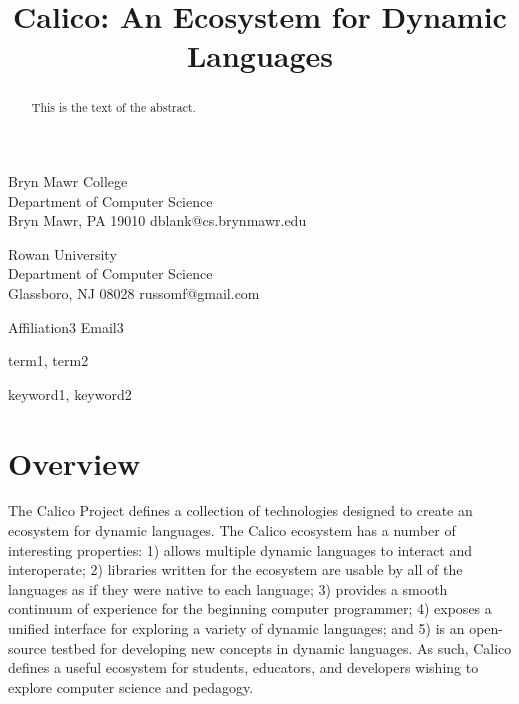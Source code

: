 \documentclass[preprint]{sigplanconf}
\begin{document}


\title{Calico: An Ecosystem for Dynamic Languages}

           {Bryn Mawr College\\Department of Computer Science\\Bryn Mawr, PA 19010}
           {dblank@cs.brynmawr.edu}

           {Rowan University\\Department of Computer Science\\Glassboro, NJ 08028}
           {russomf@gmail.com}

           {Affiliation3}
           {Email3}

\maketitle

\begin{abstract}
This is the text of the abstract.
\end{abstract}


\terms
term1, term2

\keywords
keyword1, keyword2

\section{Overview}

The Calico Project defines a collection of technologies designed to
create an ecosystem for dynamic languages. The Calico ecosystem has a
number of interesting properties: 1) allows multiple dynamic languages
to interact and interoperate; 2) libraries written for the ecosystem
are usable by all of the languages as if they were native to each
language; 3) provides a smooth continuum of experience for the
beginning computer programmer; 4) exposes a unified interface for
exploring a variety of dynamic languages; and 5) is an open-source
testbed for developing new concepts in dynamic languages. As such,
Calico defines a useful ecosystem for students, educators, and
developers wishing to explore computer science and pedagogy.
\end{document}
